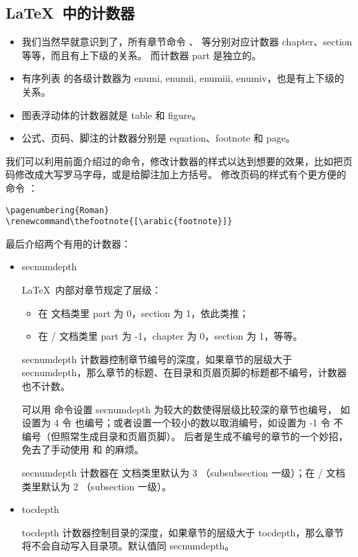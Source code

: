 \subsection{\LaTeX\ 中的计数器}\label{subsec:latex-counts}

\begin{itemize}
  \item 我们当然早就意识到了，所有章节命令 、 等分别对应计数器 chapter、section 等等，而且有上下级的关系。
而计数器 part 是独立的。
  \item 有序列表  的各级计数器为 enumi, enumii, enumiii, enumiv，也是有上下级的关系。
  \item 图表浮动体的计数器就是 table 和 figure。
  \item 公式、页码、脚注的计数器分别是 equation、footnote 和 page。
\end{itemize}

我们可以利用前面介绍过的命令，修改计数器的样式以达到想要的效果，比如把页码修改成大写罗马字母，或是给脚注加上方括号。
修改页码的样式有个更方便的命令 ：
\begin{verbatim}
\pagenumbering{Roman}
\renewcommand\thefootnote{[\arabic{footnote}]}
\end{verbatim}

最后介绍两个有用的计数器：

\begin{itemize}
  \item secnumdepth 

  \LaTeX\ 内部对章节规定了层级：
  \begin{itemize}
    \item 在  文档类里 part 为 0，section 为 1，依此类推；
    \item 在 / 文档类里 part 为 -1，chapter 为 0，section 为 1，等等。
  \end{itemize}

  secnumdepth 计数器控制章节编号的深度，如果章节的层级大于 secnumdepth，那么章节的标题、在目录和页眉页脚的标题都不编号，计数器也不计数。

  可以用  命令设置 secnumdepth 为较大的数使得层级比较深的章节也编号，
如设置为 4 令  也编号；或者设置一个较小的数以取消编号，如设置为 -1 令  不编号（但照常生成目录和页眉页脚）。
后者是生成不编号的章节的一个妙招，免去了手动使用  和  的麻烦。

  secnumdepth 计数器在  文档类里默认为 3 （subsubsection 一级）；在 / 文档类里默认为 2 （subsection 一级）。

  \item tocdepth 

  tocdepth 计数器控制目录的深度，如果章节的层级大于 tocdepth，那么章节将不会自动写入目录项。默认值同 secnumdepth。
\end{itemize}

\endinput